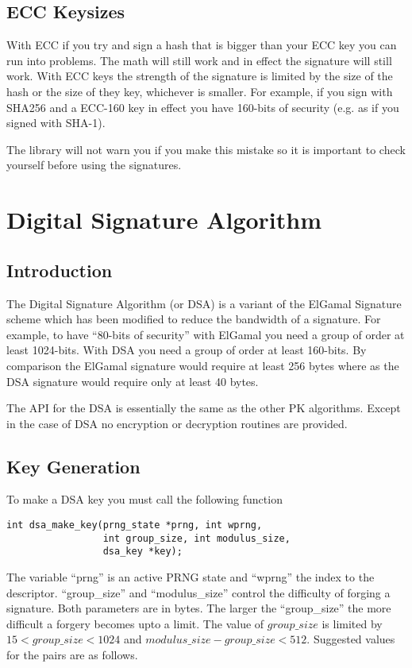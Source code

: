\documentclass[b5paper]{book}
\begin{document}
\section{ECC Keysizes}
With ECC if you try and sign a hash that is bigger than your ECC key you can run into problems.  The math will still work
and in effect the signature will still work.  With ECC keys the strength of the signature is limited by the size of
the hash or the size of they key, whichever is smaller.  For example, if you sign with SHA256 and a ECC-160 key in effect
you have 160-bits of security (e.g. as if you signed with SHA-1).  

The library will not warn you if you make this mistake so it is important to check yourself before using the 
signatures.

\chapter{Digital Signature Algorithm}
\section{Introduction}
The Digital Signature Algorithm (or DSA) is a variant of the ElGamal Signature scheme which has been modified to 
reduce the bandwidth of a signature.  For example, to have ``80-bits of security'' with ElGamal you need a group of 
order at least 1024-bits.  With DSA you need a group of order at least 160-bits.  By comparison the ElGamal signature
would require at least 256 bytes where as the DSA signature would require only at least 40 bytes.  

The API for the DSA is essentially the same as the other PK algorithms.  Except in the case of DSA no encryption or
decryption routines are provided.  

\section{Key Generation}
To make a DSA key you must call the following function
\begin{verbatim}
int dsa_make_key(prng_state *prng, int wprng, 
                 int group_size, int modulus_size, 
                 dsa_key *key);
\end{verbatim}
The variable ``prng'' is an active PRNG state and ``wprng'' the index to the descriptor.  ``group\_size'' and 
``modulus\_size'' control the difficulty of forging a signature.  Both parameters are in bytes.  The larger the
``group\_size'' the more difficult a forgery becomes upto a limit.  The value of $group\_size$ is limited by 
$15 < group\_size < 1024$ and $modulus\_size - group\_size < 512$.  Suggested values for the pairs are as follows.
\end{document}
